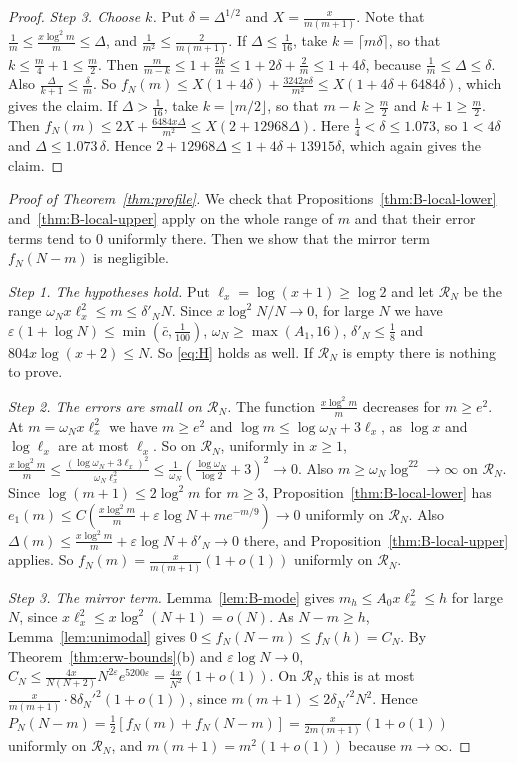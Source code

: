 \begin{proof}
\emph{Step 3. Choose $k$.} Put $\delta=\Delta^{1/2}$ and $X=\frac x{m(m+1)}$. Note that
$\frac1m\le\frac{x\log^2m}m\le\Delta$, and $\frac1{m^2}\le\frac2{m(m+1)}$. If $\Delta\le\frac1{16}$,
take $k=\lceil m\delta\rceil$, so that $k\le\frac m4+1\le\frac m2$. Then
$\frac m{m-k}\le1+\frac{2k}m\le1+2\delta+\frac2m\le1+4\delta$, because $\frac1m\le\Delta\le\delta$.
Also $\frac\Delta{k+1}\le\frac\delta m$. So
$f_N(m)\le X(1+4\delta)+\frac{3242x\delta}{m^2}\le X(1+4\delta+6484\delta)$, which gives the
claim. If $\Delta>\frac1{16}$, take $k=\lfloor m/2\rfloor$, so that $m-k\ge\frac m2$ and
$k+1\ge\frac m2$. Then $f_N(m)\le2X+\frac{6484x\Delta}{m^2}\le X(2+12968\Delta)$. Here
$\frac14<\delta\le1.073$, so $1<4\delta$ and $\Delta\le1.073\,\delta$. Hence
$2+12968\Delta\le1+4\delta+13915\delta$, which again gives the claim.
\end{proof}

\begin{proof}[Proof of Theorem~\ref{thm:profile}]
We check that Propositions~\ref{thm:B-local-lower}
and~\ref{thm:B-local-upper} apply on the whole range of $m$ and that their
error terms tend to $0$ uniformly there. Then we show that the mirror term
$f_N(N-m)$ is negligible.

\emph{Step 1. The hypotheses hold.} Put $\ell_x=\log(x+1)\ge\log2$ and let
$\mathcal R_N$ be the range
$\omega_Nx\ell_x^2\le m\le\delta'_NN$. Since $x\log^2N/N\to0$, for large $N$
we have $\varepsilon(1+\log N)\le\min(\bar c,\frac1{100})$,
$\omega_N\ge\max(A_1,16)$, $\delta'_N\le\frac18$ and $804x\log(x+2)\le N$.
So \eqref{eq:H} holds as well. If $\mathcal R_N$ is empty there is nothing to prove.

\emph{Step 2. The errors are small on $\mathcal R_N$.} The function
$\frac{x\log^2m}m$ decreases for $m\ge e^2$. At
$m=\omega_Nx\ell_x^2$ we have $m\ge e^2$ and $\log m\le\log\omega_N+3\ell_x$,
as $\log x$ and $\log\ell_x$ are at most $\ell_x$. So on $\mathcal R_N$, uniformly in
$x\ge1$,
$\frac{x\log^2m}m\le\frac{(\log\omega_N+3\ell_x)^2}{\omega_N\ell_x^2}
\le\frac1{\omega_N}(\frac{\log\omega_N}{\log2}+3)^2\to0$. Also
$m\ge\omega_N\log^22\to\infty$ on $\mathcal R_N$. Since $\log(m+1)\le2\log^2m$ for
$m\ge3$, Proposition~\ref{thm:B-local-lower} has $e_1(m)\le
C(\frac{x\log^2m}m+\varepsilon\log N+me^{-m/9})\to0$ uniformly on $\mathcal R_N$. Also
$\Delta(m)\le\frac{x\log^2m}m+\varepsilon\log N+\delta'_N\to0$ there, and
Proposition~\ref{thm:B-local-upper} applies. So
$f_N(m)=\frac{x}{m(m+1)}(1+o(1))$ uniformly on $\mathcal R_N$.

\emph{Step 3. The mirror term.} Lemma~\ref{lem:B-mode} gives $m_h\le A_0x\ell_x^2\le h$
for large $N$, since $x\ell_x^2\le x\log^2(N+1)=o(N)$. As $N-m\ge h$,
Lemma~\ref{lem:unimodal} gives $0\le f_N(N-m)\le f_N(h)=C_N$. By
Theorem~\ref{thm:erw-bounds}(b) and $\varepsilon\log N\to0$,
$C_N\le\frac{4x}{N(N+2)}N^{2\varepsilon}e^{5200\varepsilon}=\frac{4x}{N^2}(1+o(1))$.
On $\mathcal R_N$ this is at most $\frac{x}{m(m+1)}\cdot8\delta_N'^2(1+o(1))$, since
$m(m+1)\le2\delta_N'^2N^2$. Hence
$P_N(N-m)=\frac12[f_N(m)+f_N(N-m)]=\frac{x}{2m(m+1)}(1+o(1))$ uniformly
on $\mathcal R_N$, and $m(m+1)=m^2(1+o(1))$ because $m\to\infty$.
\end{proof}

